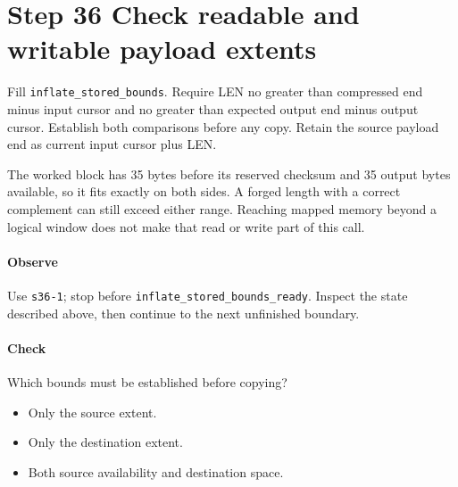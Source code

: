 \section{Step 36 Check readable and writable payload extents}\label{png-inflate-s36}
Fill \texttt{inflate\_stored\_bounds}. Require LEN no greater than compressed end minus input cursor and no greater than expected output end minus output cursor. Establish both comparisons before any copy. Retain the source payload end as current input cursor plus LEN.

The worked block has 35 bytes before its reserved checksum and 35 output bytes available, so it fits exactly on both sides. A forged length with a correct complement can still exceed either range. Reaching mapped memory beyond a logical window does not make that read or write part of this call.

\paragraph{Observe} Use \texttt{s36-1}; stop before \texttt{inflate\_stored\_bounds\_ready}. Inspect the state described above, then continue to the next unfinished boundary.

\paragraph{Check} Which bounds must be established before copying?
\begin{itemize}
\item[A.] Only the source extent.
\item[B.] Only the destination extent.
\item[C.] Both source availability and destination space.
\end{itemize}
